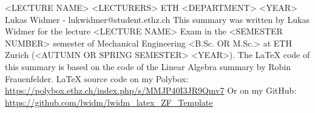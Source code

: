 \raggedbottom
\raggedright
\raggedcolumns
\begin{multicols*}{4}



	\DocumentInfo
	{<LECTURE NAME>} %
	{<LECTURERS> \newline
		ETH <DEPARTMENT> <YEAR> \newline
		Lukas Widmer - lukwidmer@student.ethz.ch} %
	{This summary was written by Lukas Widmer for the lecture <LECTURE NAME> Exam in the <SEMESTER NUMBER> semester of Mechanical Engineering <B.Sc. OR M.Sc.> at ETH Zurich (<AUTUMN OR SPRING SEMESTER> <YEAR>). \vspace{1mm}\newline
		The LaTeX code of this summary is based on the code of the Linear Algebra summary by Robin Frauenfelder. \vspace{1mm} \newline
		\LaTeX\hspace{1pt} source code on my Polybox: \newline
		\tiny \url{https://polybox.ethz.ch/index.php/s/MMJP40I3JR9Qmv7} \small \newline
		Or on my GitHub: \newline
		\tiny \url{https://github.com/lwidm/lwidm_latex_ZF_Template}\small
	}


	





\end{multicols*}



